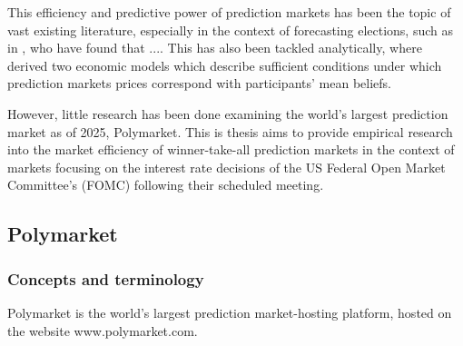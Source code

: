 


This efficiency and predictive power of prediction markets has been the topic
of vast existing literature, especially in the context of forecasting elections, such as in
\cite{berg_prediction_2008} \cite{erikson_are_2008}, who have found that .... 
This has also been tackled analytically, where \cite{wolfers_interpreting_2006} derived two economic models which
describe sufficient conditions under which prediction markets prices correspond with participants' mean beliefs.

However, little research has been done examining the world's largest prediction market as of 2025, Polymarket.
This is thesis aims to provide empirical research into the market efficiency of winner-take-all prediction markets 
in the context of markets focusing on the interest rate decisions of the US Federal Open Market Committee's (FOMC) following their scheduled meeting.

\newpage

\subsection{Polymarket}


\subsubsection{Concepts and terminology}
Polymarket is the world's largest prediction market-hosting platform, %
hosted on the website www.polymarket.com.

